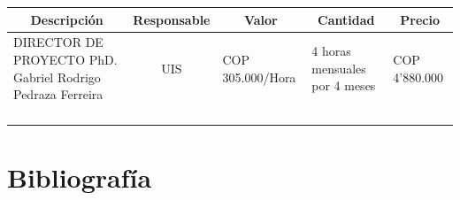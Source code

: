 \documentclass[12pt]{article}
\begin{document}
    \begin{table}[ht]
    \small
            \begin{tabularx}{\textwidth}{|X|c|X|X|X|}
                \hline
                \multicolumn{1}{|c}{\textbf{Descripción}} & \multicolumn{1}{|c}{\textbf{Responsable}} & \multicolumn{1}{|c}{\textbf{Valor}} & \multicolumn{1}{|c}{\textbf{Cantidad}} & \multicolumn{1}{|c|}{\textbf{Precio}} \\ \hline
                DIRECTOR DE PROYECTO PhD. Gabriel Rodrigo Pedraza Ferreira & UIS & COP 305.000/Hora & \multicolumn{1}{X|}{\raggedright 4 horas mensuales por 4 meses} & COP 4'880.000 \\ \hline
        &  &  &  &  \\ \hline
        &  &  &  &  \\ \hline
        &  &  &  &  \\ \hline
        &  &  &  &  \\ \hline
        
        \end{tabularx}{\parfillskip=0pt\par}
    \end{table}
    

    \pagebreak

    \section{Bibliografía}

    \begingroup
    \renewcommand{\section}[2]{}
    \renewcommand{\addcontentsline}[3]{}
    
    \endgroup
\end{document}
